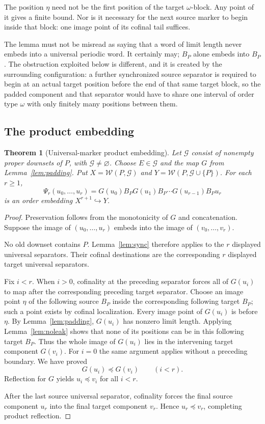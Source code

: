 \documentclass[11pt,a4paper]{article}
\numberwithin{equation}{section}
\newtheorem{theorem}{Theorem}[section]
\theoremstyle{definition}
\theoremstyle{remark}
\newcommand{\W}{\mathcal W}
\newcommand{\G}{\mathcal G}
\newcommand{\emb}{\preccurlyeq}
\begin{document}
The position $\eta$ need not be the first position of the target
$\omega$-block. Any point of it gives a finite bound. Nor is it necessary
for the next source marker to begin inside that block: one image point of
its cofinal tail suffices.

The lemma must not be misread as saying that a word of limit length never
embeds into a universal periodic word. It certainly may; $B_P$ alone embeds
into $B_P$. The obstruction exploited below is different, and it is created by
the surrounding configuration: a further synchronized source separator is
required to begin at an actual target position before the end of that same
target block, so the padded component and that separator would have to share
one interval of order type $\omega$ with only finitely many positions between
them.

\subsection{The product embedding}

\begin{theorem}[Universal-marker product embedding]\label{thm:full}
Let $\G$ consist of nonempty proper downsets of $P$, with
$\G\ne\varnothing$. Choose $E\in\G$ and the map $G$ from
Lemma~\ref{lem:padding}. Put
$X=\W(P,\G)$ and $Y=\W(P,\G\cup\{P\})$. For each $r\ge1$,
\begin{equation}\label{eq:fullmap}
 \Psi_r(u_0,\ldots,u_r)
  =G(u_0)B_PG(u_1)B_P\cdots G(u_{r-1})B_Pu_r
\end{equation}
is an order embedding $X^{r+1}\hookrightarrow Y$.
\end{theorem}
\begin{proof}
Preservation follows from the monotonicity of $G$ and concatenation.
Suppose the image of $(u_0,\ldots,u_r)$ embeds into the image of
$(v_0,\ldots,v_r)$.

No old downset contains $P$. Lemma~\ref{lem:sync} therefore applies to the
$r$ displayed universal separators. Their cofinal destinations are the
corresponding $r$ displayed target universal separators.

Fix $i<r$. When $i>0$, cofinality at the preceding separator forces all of
$G(u_i)$ to map after the corresponding preceding target separator.
Choose an image point $\eta$ of the following source $B_P$ inside the
corresponding following target $B_P$; such a point exists by cofinal
localization. Every image point of $G(u_i)$ is before $\eta$.
By Lemma~\ref{lem:padding}, $G(u_i)$ has nonzero limit length. Applying
Lemma~\ref{lem:noleak} shows that none of its positions can be in this
following target $B_P$. Thus the whole image of $G(u_i)$ lies in the
intervening target component $G(v_i)$. For $i=0$ the same argument applies
without a preceding boundary. We have proved
\[
 G(u_i)\emb G(v_i)\qquad(i<r).
\]
Reflection for $G$ yields $u_i\emb v_i$ for all $i<r$.

After the last source universal separator, cofinality forces the final
source component $u_r$ into the final target component $v_r$. Hence
$u_r\emb v_r$, completing product reflection.
\end{proof}
\end{document}
